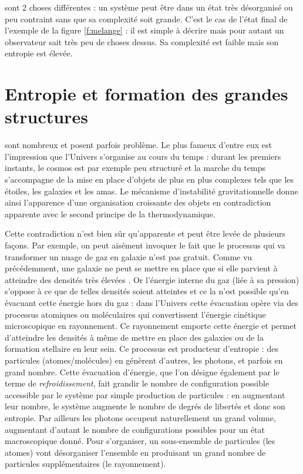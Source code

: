  sont 2 choses différentes : un système peut être dans un état très désorganisé ou peu contraint sans que sa complexité soit grande. C'est le cas de l'état final de l'exemple de la figure \ref{f:melange} : il est simple à décrire mais pour autant un observateur sait très peu de choses dessus. Sa complexité est faible mais son entropie est élevée. 

\section{Entropie et formation des grandes structures}
 sont nombreux et posent parfois problème. Le plus fameux d'entre eux est l'impression que l'Univers s'organise au cours du temps : durant les premiers instants, le cosmos est par exemple peu structuré et la marche du temps s'accompagne de la mise en place d'objets de plus en plus complexes tels que les étoiles, les galaxies et les amas. Le mécanisme d'instabilité gravitationnelle donne ainsi l'apparence d'une organisation croissante des objets en contradiction apparente avec le second principe de la thermodynamique. 

Cette contradiction n'est bien sûr qu'apparente et peut être levée de plusieurs façons. Par exemple, on peut aisément invoquer le fait que le processus qui va transformer un nuage de gaz en galaxie n'est pas gratuit. Comme vu précédemment, une galaxie ne peut se mettre en place que si elle parvient à atteindre des densités très élevées . Or l'énergie interne du gaz (liée à sa pression) s'oppose à ce que de telles densités soient atteintes et ce la n'est possible qu'en évacuant cette énergie hors du gaz : dans l'Univers cette évacuation opère via des processus atomiques ou moléculaires qui convertissent l'énergie cinétique microscopique en rayonnement. Ce rayonnement emporte cette énergie et permet d'atteindre les densités à même de mettre en place des galaxies ou de la formation stellaire en leur sein. Ce processus est producteur d'entropie : des particules (atomes/molécules) en génèrent d'autres, les photons, et parfois en grand nombre. Cette évacuation d'énergie, que l'on désigne également par le terme de \textit{refroidissement}, fait grandir le nombre de configuration possible accessible par le système par simple production de particules : en augmentant leur nombre, le système augmente le nombre de degrés de libertés et donc son entropie. Par ailleurs les photons occupent naturellement un grand volume, augmentant d'autant le nombre de configurations possibles pour un état macroscopique donné.  Pour s'organiser, un sous-ensemble de particules (les atomes) vont désorganiser l'ensemble en produisant un grand nombre de particules supplémentaires (le rayonnement).

